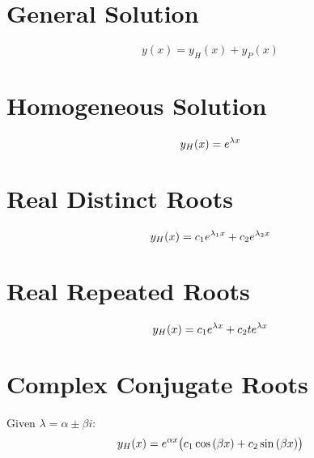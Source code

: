 \documentclass{article}
\begin{document}
\begin{multicols}{3}
    \section*{General Solution}
    \begin{equation*}
        y(x) = y_H(x) + y_P(x)
    \end{equation*}
    \section*{Homogeneous Solution}
    \begin{equation*}
        y_H(x) = e^{\lambda x}
    \end{equation*}
    \section*{Real Distinct Roots}
    \begin{equation*}
        y_H(x) = c_1e^{\lambda_1 x} + c_2e^{\lambda_2 x}
    \end{equation*}
    \section*{Real Repeated Roots}
    \begin{equation*}
        y_H(x) = c_1e^{\lambda x} + c_2 te^{\lambda x}
    \end{equation*}
    \section*{Complex Conjugate Roots}
    Given $\lambda = \alpha \pm \beta i$:
    \begin{equation*}
        y_H(x) = e^{\alpha x}\bigl( c_1\cos{\left( \beta x \right)} + c_2 \sin{\left( \beta x \right)} \bigr)
    \end{equation*}

\end{multicols}
\end{document}

